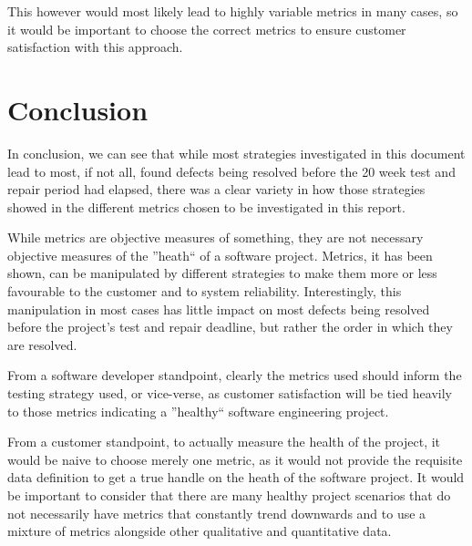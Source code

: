 \documentclass[a4paper,10pt]{article}
\begin{document}
This however would most likely lead to highly variable metrics in many cases, so it would be important to choose the correct metrics to ensure customer satisfaction with this approach.

\section{Conclusion}
In conclusion, we can see that while most strategies investigated in this document lead to most, if not all, found defects being resolved before the 20 week test and repair period had elapsed, there was a clear variety in how those strategies showed in the different metrics chosen to be investigated in this report. 

While metrics are objective measures of something, they are not necessary objective measures of the ''heath`` of a software project. Metrics, it has been shown, can be manipulated by different strategies to make them more or less favourable to the customer and to system reliability. Interestingly, this manipulation in most cases has little impact on most defects being resolved before the project's test and repair deadline, but rather the order in which they are resolved.

From a software developer standpoint, clearly the metrics used should inform the testing strategy used, or vice-verse, as customer satisfaction will be tied heavily to those metrics indicating a ''healthy`` software engineering project.

From a customer standpoint, to actually measure the health of the project, it would be naive to choose merely one metric, as it would not provide the requisite data definition to get a true handle on the heath of the software project. It would be important to consider that there are many healthy project scenarios that do not necessarily have metrics that constantly trend downwards and to use a mixture of metrics alongside other qualitative and quantitative data.

%
\end{document}
